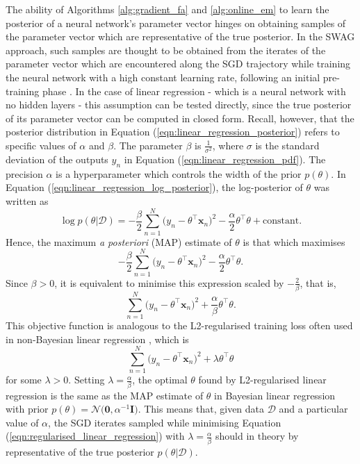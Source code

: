 \documentclass[msc,deptreport.inf]{infthesis} %
\newcommand{\matr}[1]{\mathbf{#1}}
\begin{document}
The ability of Algorithms \ref{alg:gradient_fa} and \ref{alg:online_em} to learn the posterior of a neural network's parameter vector hinges on obtaining samples of the parameter vector which are representative of the true posterior. In the SWAG approach, such samples are thought to be obtained from the iterates of the parameter vector which are encountered along the SGD trajectory while training the neural network with a high constant learning rate, following an initial pre-training phase \cite{maddox2019}. In the case of linear regression - which is a neural network with no hidden layers - this assumption can be tested directly, since the true posterior of its parameter vector can be computed in closed form. Recall, however, that the posterior distribution in Equation (\ref{eqn:linear_regression_posterior}) refers to specific values of $\alpha$ and $\beta$. The parameter $\beta$ is $\frac{1}{\sigma^2}$, where $\sigma$ is the standard deviation of the outputs $y_n$ in Equation (\ref{eqn:linear_regression_pdf}). The precision $\alpha$ is a hyperparameter which controls the width of the prior $p(\theta)$. In Equation (\ref{eqn:linear_regression_log_posterior}), the log-posterior of $\theta$ was written as 
\begin{equation}
	\log p(\theta | \mathcal{D}) 
	= -\frac{\beta}{2} \sum_{n=1}^N \big(y_n - \theta^\intercal \matr{x}_n \big)^2 
	-\frac{\alpha}{2} \theta^\intercal \theta 
	+ \text{constant}.
\end{equation}
Hence, the maximum \emph{a posteriori} (MAP) estimate of $\theta$ is that which maximises
\begin{equation}
	-\frac{\beta}{2} \sum_{n=1}^N \big(y_n - \theta^\intercal \matr{x}_n \big)^2 
	-\frac{\alpha}{2} \theta^\intercal \theta.
\end{equation}
Since $\beta > 0$, it is equivalent to minimise this expression scaled by $-\frac{2}{\beta}$, that is,
\begin{equation}
	\sum_{n=1}^N \big(y_n - \theta^\intercal \matr{x}_n \big)^2 
	+ \frac{\alpha}{\beta} \theta^\intercal \theta.
\end{equation}
This objective function is analogous to the L2-regularised training loss often used in non-Bayesian linear regression \cite{barber2007}, which is 
\begin{equation}\label{eqn:regularised_linear_regression}
	\sum_{n=1}^N \big(y_n - \theta^\intercal \matr{x}_n \big)^2 
	+ \lambda \theta^\intercal \theta 
\end{equation}
for some $\lambda > 0$. Setting $\lambda = \frac{\alpha}{\beta}$, the optimal $\theta$ found by L2-regularised linear regression is the same as the MAP estimate of $\theta$ in Bayesian linear regression with prior $p(\theta) = \mathcal{N}\big(\matr{0}, \alpha^{-1} \matr{I} \big)$. This means that, given data $\mathcal{D}$ and a particular value of $\alpha$, the SGD iterates sampled while minimising Equation (\ref{eqn:regularised_linear_regression}) with $\lambda = \frac{\alpha}{\beta}$ should in theory by representative of the true posterior $p(\theta | \mathcal{D})$.
 
\end{document}
